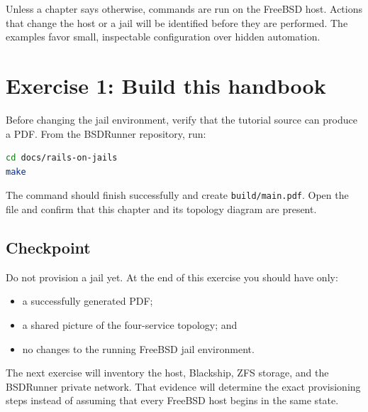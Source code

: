 Unless a chapter says otherwise, commands are run on the FreeBSD host. Actions
that change the host or a jail will be identified before they are performed.
The examples favor small, inspectable configuration over hidden automation.

\section{Exercise 1: Build this handbook}

Before changing the jail environment, verify that the tutorial source can
produce a PDF. From the BSDRunner repository, run:

\begin{lstlisting}[language=sh]
cd docs/rails-on-jails
make
\end{lstlisting}

The command should finish successfully and create \texttt{build/main.pdf}.
Open the file and confirm that this chapter and its topology diagram are
present.

\subsection*{Checkpoint}

Do not provision a jail yet. At the end of this exercise you should have only:

\begin{itemize}
  \item a successfully generated PDF;
  \item a shared picture of the four-service topology; and
  \item no changes to the running FreeBSD jail environment.
\end{itemize}

The next exercise will inventory the host, Blackship, ZFS storage, and the
BSDRunner private network. That evidence will determine the exact provisioning
steps instead of assuming that every FreeBSD host begins in the same state.
